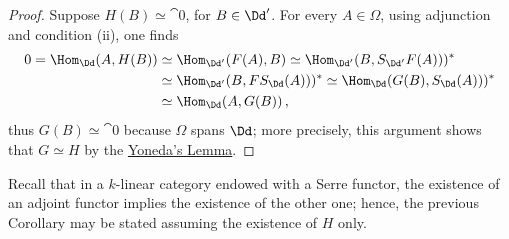 \begin{cor}
\begin{proof}
        Suppose $H(B) \simeq \cat{0}$, for $B \in \Dd'$.
        For every $A \in \Omega$, using adjunction and condition (ii),
        one finds
        \begin{align*}
            0 = \Hom_{\Dd}(A,H(B))
            &\simeq \Hom_{\Dd'}(F(A),B)
            \simeq \Hom_{\Dd'}(B,S_{\Dd'}F(A)))^* \\
            & \simeq \Hom_{\Dd'}(B,FS_{\Dd}(A)))^*
            \simeq \Hom_{\Dd}(G(B),S_{\Dd}(A)))^* \\
            & \simeq \Hom_{\Dd}(A,G(B))\,,
        \end{align*}
        thus $G(B) \simeq \cat{0}$ because $\Omega$ spans $\Dd$;
        more precisely, this argument shows that $G \simeq H$
        by the \hyperref[yoneda]{Yoneda's Lemma}.
    \end{proof}
\end{cor}

Recall that in a $k$-linear category endowed with a
Serre functor, the existence of an adjoint functor 
implies the existence of the other one; hence,
the previous Corollary may be stated assuming the existence
of $H$ only.